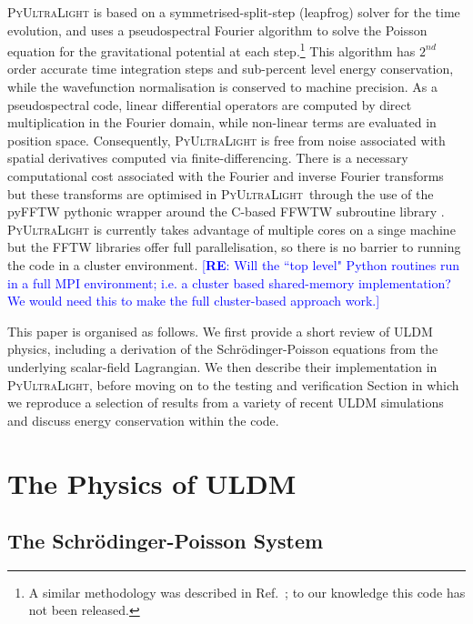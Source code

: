 \documentclass[a4paper,11pt]{article}
\newcommand{\PyUltraLight}{\textsc{PyUltraLight}\xspace}
\newcommand{\re}[1]{\textcolor{blue}{[{\bf RE}: #1]}}
\begin{document}
\PyUltraLight is based on a symmetrised-split-step (leapfrog) solver for the time evolution, and uses a pseudospectral Fourier algorithm to solve the Poisson equation for the gravitational potential at each step.\footnote{A similar methodology was described in Ref.~\cite{Paredes2016}; to our knowledge this code has not been released.} This algorithm has $2^{nd}$ order accurate time integration steps and sub-percent level energy conservation, while the wavefunction normalisation  is conserved to machine precision. As a pseudospectral code, linear differential operators are computed by direct multiplication in the Fourier domain, while non-linear terms are evaluated in position space. Consequently, \PyUltraLight is free from noise associated with spatial derivatives computed via finite-differencing. There is a necessary computational cost associated with the Fourier and inverse Fourier transforms but these transforms are optimised in \PyUltraLight\ through the use of the pyFFTW pythonic wrapper around the C-based FFWTW subroutine library \cite{pyfftw,fftw}. \PyUltraLight is currently takes advantage of multiple cores on a singe machine but the FFTW libraries offer full parallelisation, so there is no barrier to running the code in a cluster environment. \re{ Will the ``top level" Python routines run in a full MPI environment; i.e. a cluster based shared-memory implementation? We would need this to make the full cluster-based approach work.}

This paper is organised as follows. We first provide a short review of ULDM physics, including a derivation of the Schr{\"o}dinger-Poisson equations from the underlying scalar-field Lagrangian. We then describe their implementation in \PyUltraLight, before moving on to the testing and verification Section in which we reproduce a selection of results from a variety of recent ULDM simulations and discuss energy conservation within the code. 


\section{The Physics of ULDM}\label{sec:physics}

\subsection{The Schr{\"o}dinger-Poisson System}
\end{document}
